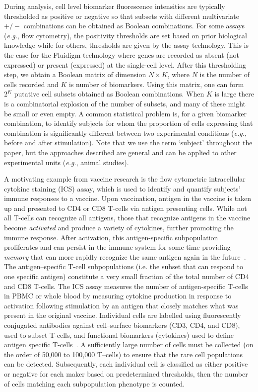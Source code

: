 \documentclass[12pt,oupdraft]{biostatistics}
\begin{document}
During analysis, cell level biomarker fluorescence intensities are typically thresholded as positive or negative so that subsets with different multivariate $+/-$ combinations can be obtained as Boolean combinations.
For some assays (\textit{e.g.}, flow cytometry), the positivity thresholds are set based on prior biological knowledge while for others, thresholds are given by the assay technology.
This is the case for the Fluidigm technology where genes are recorded as absent (not expressed) or present (expressed) at the single-cell level.
 After this thresholding step, we obtain a Boolean matrix of dimension $N\times K$, where $N$ is the number of cells recorded and $K$ is number of biomarkers.
Using this matrix, one can form $2^K$ putative cell subsets obtained as Boolean combinations.
When $K$ is large there is a combinatorial explosion of the number of subsets, and many of these might be small or even empty.
A common statistical problem is, for a given biomarker combination, to identify subjects for whom the proportion of cells expressing that combination is significantly different between two experimental conditions (\textit{e.g.}, before and after stimulation). Note that we use the term `subject' throughout the paper, but the approaches described are general and can be applied to other experimental units (\textit{e.g.}, animal studies).

A motivating example from vaccine research is the flow cytometric intracellular cytokine staining (ICS) assay, which is used to identify and quantify subjects' immune responses to a vaccine. Upon vaccination, antigen in the vaccine is taken up and presented to CD4 or CD8 T-cells via antigen presenting cells.
 While not all T-cells can recognize all antigens, those that recognize antigens in the vaccine become \emph{activated} and produce a variety of cytokines, further promoting the immune response.
 After activation, this antigen-specific subpopulation proliferates and can persist in the immune system for some time providing \emph{memory} that can more rapidly recognize the same antigen again in the future~\citep{McKinstry:2010ei}. The antigen--specific T-cell subpopulations (i.e. the subset that can respond to one specific antigen) constitute a very small fraction of the total number of CD4 and CD8 T-cells. The ICS assay measures the number of antigen-specific T-cells in PBMC or whole blood by measuring cytokine production in response to activation following stimulation by an antigen that closely matches what was present in the original vaccine.
Individual cells are labelled using fluorescently conjugated antibodies against cell--surface biomarkers (CD3, CD4, and CD8), used to subset T-cells, and functional biomarkers (cytokines) used to define antigen specific T-cells~\citep{Horton:2007tsa,DeRosa:2004wp,Betts:2006dw}.
A sufficiently large number of cells must be collected (on the order of 50,000 to 100,000 T--cells) to ensure that the rare cell populations can be detected.
Subsequently, each individual cell is classified as either positive or negative for each maker based on predetermined thresholds, then the number of cells matching each subpopulation phenotype is counted.
\end{document}
